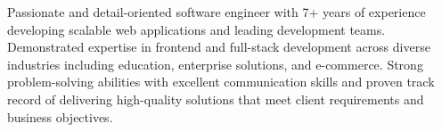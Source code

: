 \documentclass[9pt]{developercv} %
\begin{document}

Passionate and detail-oriented software engineer with 7+ years of experience developing scalable web applications and leading development teams. Demonstrated expertise in frontend and full-stack development across diverse industries including education, enterprise solutions, and e-commerce. Strong problem-solving abilities with excellent communication skills and proven track record of delivering high-quality solutions that meet client requirements and business objectives.

\vspace{0.15cm}

\end{document}
